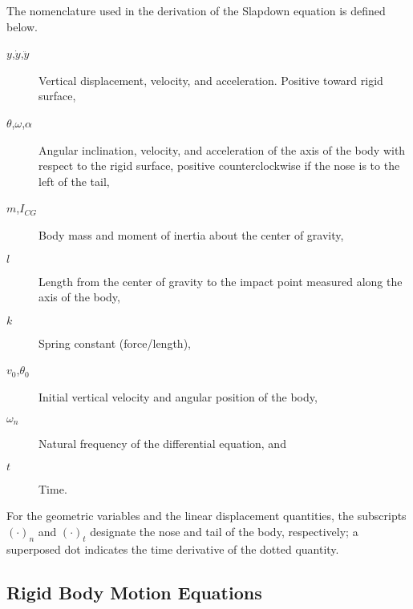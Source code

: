The nomenclature used in the derivation of the Slapdown equation is
defined below.
\begin{description}
\item[$y$,$\dot y$,$\ddot y$] Vertical displacement, velocity, and
acceleration.  Positive toward rigid surface,
\item[$\theta$,$\omega$,$\alpha$] Angular inclination, velocity, and
acceleration of the axis of the body with respect to the rigid
surface, positive counterclockwise if the nose is to the left of the
tail, 
\item[$m$,$I_{CG}$]
Body mass and moment of inertia about the center of
gravity,
\item[$l$]       Length from the center of gravity to the impact point
measured along the axis of the body,
\item[$k$]       Spring constant (force/length),
\item[$v_0$,$\theta_0$]     Initial vertical velocity and angular
position of the body, 
\item[$\omega_n$] Natural frequency of the differential equation, and 
\item[$t$]        Time.
\end{description}
For the geometric variables and the linear displacement quantities, the
subscripts $(\cdot)_n$ and $(\cdot)_t$ designate the nose and tail 
of the body, respectively; a superposed dot indicates the time
derivative of the dotted quantity.

\subsection{Rigid Body Motion Equations}


